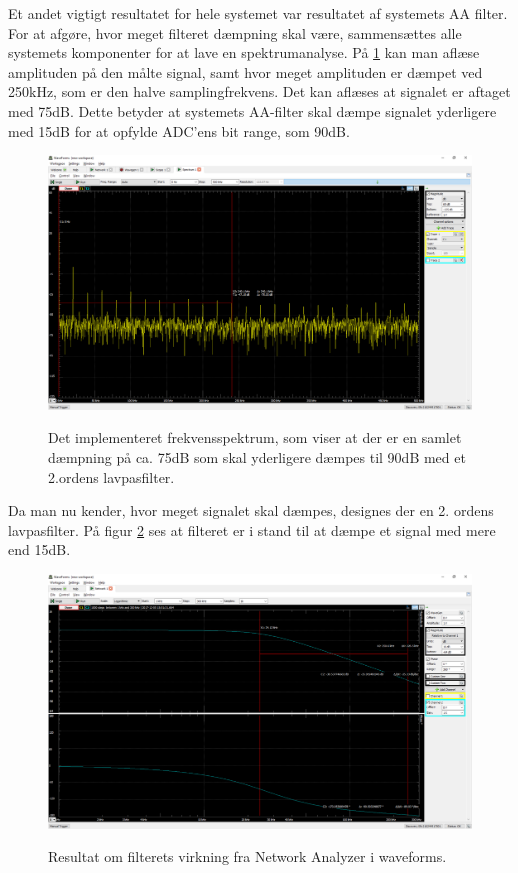 \pagebreak 

Et andet vigtigt resultatet for hele systemet var resultatet af systemets AA filter. For at afgøre, hvor meget filteret dæmpning skal være, sammensættes alle systemets komponenter for at lave en spektrumanalyse. På \ref{fig:aaspectrum1} kan man aflæse amplituden på den målte signal, samt hvor meget amplituden er dæmpet ved 250kHz, som er den halve samplingfrekvens. Det kan aflæses at signalet er aftaget med 75dB. Dette betyder at systemets AA-filter skal dæmpe signalet yderligere med 15dB  for at opfylde ADC'ens bit range, som 90dB.   

       
\begin{figure}[H] 
\centering
{\includegraphics[width=\linewidth]
{Figure/aaspectrum1}}
\caption{Det implementeret frekvensspektrum, som viser at der er en samlet dæmpning på ca. 75dB som skal yderligere dæmpes til 90dB med et 2.ordens lavpasfilter.}
\label{fig:aaspectrum1}
\end{figure}

\pagebreak

Da man nu kender, hvor meget signalet skal dæmpes, designes der en 2. ordens lavpasfilter. På figur \ref{fig:aafiltermodultest} ses at filteret er i stand til at dæmpe et signal med mere end 15dB. 


\begin{figure}[H] 
\centering
{\includegraphics[width=\linewidth]
{Figure/aafiltermodultest}}
\caption{Resultat om filterets virkning fra Network Analyzer i waveforms.}
\label{fig:aafiltermodultest}
\end{figure}




